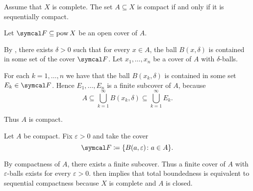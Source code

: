 \begin{Theorem}\label{thm:metric_compact_iff_sequentially_compact}
  Assume that \( X \) is complete. The set \( A \subseteq X \) is compact if and only if it is sequentially compact.
\end{Theorem}
\begin{RefListProof}
    \ISufficiency Let \( \Cal{F} \subseteq \Pow X \) be an open cover of \( A \).

    By , there exists \( \delta > 0 \) such that for every \( x \in A \), the ball \( B(x, \delta) \) is contained in some set of the cover \( \Cal{F} \). Let \( x_1, \ldots, x_n \) be a cover of \( A \) with \( \delta \)-balls.

    For each \( k = 1, \ldots, n \) we have that the ball \( B(x_k, \delta) \) is contained in some set \( E_k \in \Cal{F} \). Hence \( E_1, \ldots, E_n \) is a finite subcover of \( A \), because
    \begin{equation*}
      A \subseteq \bigcup_{k=1}^\infty B(x_k, \delta) \subseteq \bigcup_{k=1}^\infty E_k.
    \end{equation*}

    Thus \( A \) is compact.

    \INecessity Let \( A \) be compact. Fix \( \varepsilon > 0 \) and take the cover
    \begin{equation*}
      \Cal{F} \coloneqq \{ B(a, \varepsilon) \colon a \in A \}.
    \end{equation*}

    By compactness of \( A \), there exists a finite subcover. Thus a finite cover of \( A \) with \( \varepsilon \)-balls exists for every \( \varepsilon > 0 \).  then implies that total boundedness is equivalent to sequential compactness because \( X \) is complete and \( A \) is closed.
\end{RefListProof}

